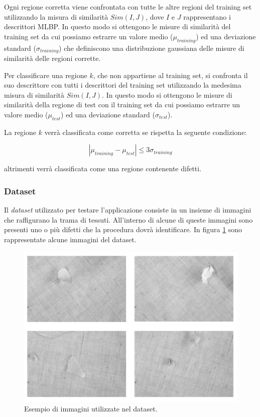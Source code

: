 Ogni regione corretta viene confrontata con tutte le altre regioni del training set utilizzando la misura di similarità $Sim(I, J)$, dove  $I$ e $J$ rappresentano i descrittori \acs{MLBP}.
In questo modo si ottengono le misure di similarità del training set da cui possiamo estrarre un valore medio ($\mu_{training}$) ed una deviazione standard ($\sigma_{training}$) che definiscono una distribuzione gaussiana delle misure di similarità delle regioni corrette.

Per classificare una regione $k$, che non appartiene al training set, si confronta il suo descrittore con tutti i descrittori del training set utilizzando la medesima misura di similarità $Sim(I, J)$. In questo modo si ottengono le misure di similarità della regione di test con il training set da cui possiamo estrarre un valore medio ($\mu_{test}$) ed una deviazione standard ($\sigma_{test}$).

La regione $k$ verrà classificata come corretta se rispetta la seguente condizione:

\begin{equation}
|\mu_{training}- \mu_{test}| \le 3\sigma_{training}
\end{equation}

\noindent altrimenti verrà classificata come una regione contenente difetti.

\pagebreak

\subsubsection{Dataset}
Il \textit{dataset} utilizzato per testare l'applicazione consiste in un insieme di immagini che raffigurano la trama di tessuti. All'interno di alcune di queste immagini sono presenti uno o più difetti che la procedura dovrà identificare. In figura \ref{fig:esDataset} sono rappresentate alcune immagini del dataset.

\begin{figure}[ht]
\begin{center}
\includegraphics[width=.95\textwidth]{img/esempioDataset}
\caption{ Esempio di immagini utilizzate nel dataset.}
\label{fig:esDataset}
\end{center}
\end{figure}

\pagebreak
